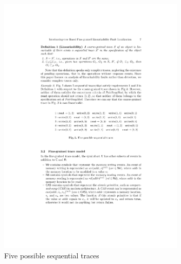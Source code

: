 \documentclass[runningheads]{llncs}
\newcommand{\pair}[1]{{\langle{#1}\rangle}}
\begin{document}
\begin{figure}
\centering
\includegraphics[width = 3.5in]{5seqs.pdf}
\vspace{-0.2cm}
	
	
	
	
    \caption{Five possible sequential traces}\label{fig:accounttwoseqtraces}
\end{figure}
\end{document}
